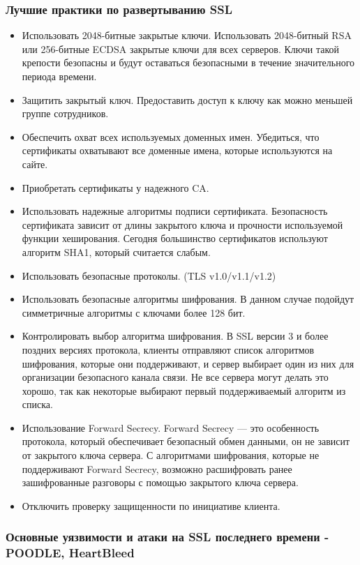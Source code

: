 \documentclass[a4paper, 14pt]{article}				%
\begin{document}
\subsubsection{Лучшие практики по развертыванию SSL}
\begin{itemize}
\item Использовать 2048-битные закрытые ключи.
Использовать 2048-битный RSA или 256-битные ECDSA закрытые ключи для всех серверов. Ключи такой крепости безопасны и будут оставаться безопасными в течение значительного периода времени.
\item Защитить закрытый ключ. Предоставить доступ к ключу как можно меньшей группе сотрудников.
\item Обеспечить охват всех используемых доменных имен. Убедиться, что сертификаты охватывают все доменные имена, которые используются на сайте.
\item Приобретать сертификаты у надежного CA.
\item Использовать надежные алгоритмы подписи сертификата. Безопасность сертификата зависит от длины закрытого ключа и прочности используемой функции хеширования. Сегодня большинство сертификатов используют алгоритм SHA1, который считается слабым. 
\item Использовать безопасные протоколы. (TLS v1.0/v1.1/v1.2)
\item Использовать безопасные алгоритмы шифрования. В данном случае подойдут симметричные алгоритмы с ключами более 128 бит.
\item Контролировать выбор алгоритма шифрования. В SSL версии 3 и более поздних версиях протокола, клиенты отправляют список алгоритмов шифрования, которые они поддерживают, и сервер выбирает один из них для организации безопасного канала связи. Не все сервера могут делать это хорошо, так как некоторые выбирают первый поддерживаемый алгоритм из списка.
\item Использование Forward Secrecy. Forward Secrecy — это особенность протокола, который обеспечивает безопасный обмен данными, он не зависит от закрытого ключа сервера. С алгоритмами шифрования, которые не поддерживают Forward Secrecy, возможно расшифровать ранее зашифрованные разговоры с помощью закрытого ключа сервера.
\item Отключить проверку защищенности по инициативе клиента.
\end{itemize}

\subsubsection{Основные уязвимости и атаки на SSL последнего времени - POODLE, HeartBleed}
\end{document}
